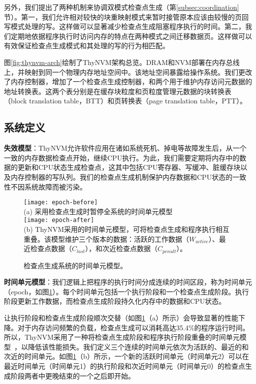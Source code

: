 另外，我们提出了两种机制来协调双模式检查点生成（第\ref{subsec:coordination}节）。第一，我们允许相对较快的块重映射模式来暂时接管原本应该由较慢的页回写模式处理的写。这样做可以显著减少检查点生成阻塞程序执行的时间。第二，我们定期地依据程序执行时访问内存的特点在两种模式之间迁移数据页。这样做可以有效保证检查点生成模式和其处理的写的行为相匹配。

图\ref{fig:thynvm-arch}绘制了ThyNVM架构总览。DRAM和NVM部署在内存总线上，并映射到同一个物理内存地址空间中。该地址空间暴露给操作系统。我们更改了内存控制器，增加了一个检查点生成控制器，和两个用于维护内存访问元数据的地址转换表。这两个表分别是在缓存块粒度和页粒度管理元数据的块转换表（block translation table，BTT）和页转换表（page translation table，PTT）。

\subsection{系统定义}

\textbf{失效模型}：ThyNVM允许软件应用在诸如系统死机、掉电等故障发生后，从一个一致的内存数据检查点开始，继续CPU执行。为此，我们需要定期将内存中的数据的更新和CPU状态生成检查点，这其中包括CPU寄存器、写缓冲、脏缓存块以及内存控制器的写队列。我们的检查点生成机制保护内存数据和CPU状态的一致性不因系统故障而被污染。

\begin{figure}[!h]
\centering
\texttt{[image: epoch-before]}\\
{\small (a) 采用检查点生成时暂停全系统的时间单元模型}\\
\vspace{10pt}
\texttt{[image: epoch-after]}\\
{\small (b) ThyNVM采用的时间单元模型，可将检查点生成和程序执行相互重叠。该模型维护三个版本的数据：活跃的工作数据（$W_{active}$）、最近检查点数据（$C_{last}$），和次近检查点数据（$C_{penult}$）。\hfill}
\caption{检查点生成系统的时间单元模型。}
\label{fig-epoch}
\end{figure}

\textbf{时间单元模型}：我们逻辑上把程序的执行时间分成连续的时间区段，称为时间单元（epoch，如图\ref{fig-epoch}）。每个时间单元包括一个执行阶段和一个检查点生成阶段。执行阶段更新工作数据，而检查点生成阶段持久化内存中的数据和CPU状态。

让执行阶段和检查点生成阶段顺次交替（如图\ref{fig-epoch}（a）所示）会导致显著的性能下降。对于内存访问频繁的负载，检查点生成可以消耗高达35.4\%的程序运行时间。所以，ThyNVM采用了一种将检查点生成阶段和程序执行阶段重叠的时间单元模型~\cite{1003568}，以降低该性能损失。我们定义三个连续的时间单元依次为活跃的、最近的和次近的时间单元。如图\ref{fig-epoch}（b）所示，一个新的活跃时间单元（时间单元2）可以在最近时间单元（时间单元1）的执行阶段和次近时间单元（时间单元0）的检查点生成阶段两者中更晚结束的一个之后即开始。


